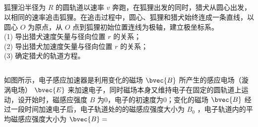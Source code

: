 \subsection{ }
狐狸沿半径为 $R$ 的圆轨道以速率 $v$ 奔跑，在狐狸出发的同时，猎犬从圆心出发，以相同的速率追击狐狸。在追击过程中，圆心、狐狸和猎犬始终连成一条直线，以圆心 $O$ 为原点，从 $O$ 点到狐狸初始位置连线为极轴，建立极坐标系。\\
(1) 导出猎犬速度矢量与径向位置 $r$ 的关系；\\
(2) 导出猎犬加速度矢量与径向位置 $r$ 的关系；\\
(3) 确定猎犬的轨道方程。

\subsection{ }
如图所示，电子感应加速器是利用变化的磁场 $\bvec{B}$ 所产生的感应电场（漩涡电场） $\bvec{E}$ 来加速电子，同时磁场本身又维持电子在固定的圆轨道上运动，设开始时，磁感应强度 $B$ 为0，电子的初速度为0；变化的磁场 $\bvec{B}$ 经过一段时间加速电子后，电子轨道处的的磁感应强度大小为 $B_{0}$ ，电子轨道内的平均磁感应强度大小为 $\bvec{B} = $